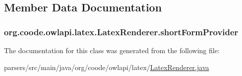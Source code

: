 \subsection{Member Data Documentation}
\hypertarget{classorg_1_1coode_1_1owlapi_1_1latex_1_1_latex_renderer_a988ecbd7d880d0c244749e1556a8b74b}{
\subsubsection[{short\-Form\-Provider}]{ org.\-coode.\-owlapi.\-latex.\-Latex\-Renderer.\-short\-Form\-Provider\hspace{0.3cm}{\ttfamily [private]}}}\label{classorg_1_1coode_1_1owlapi_1_1latex_1_1_latex_renderer_a988ecbd7d880d0c244749e1556a8b74b}


The documentation for this class was generated from the following file\-:\begin{DoxyCompactItemize}
\item 
parsers/src/main/java/org/coode/owlapi/latex/\hyperlink{_latex_renderer_8java}{Latex\-Renderer.\-java}\end{DoxyCompactItemize}
